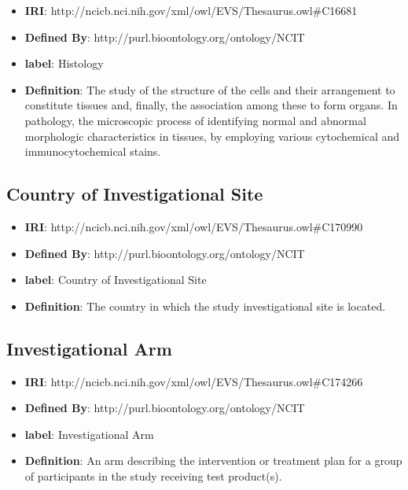 \documentclass[a4paper,12pt,oneside]{article}
\begin{document}
   \begin{itemize}
      \item \textbf{IRI}: http://ncicb.nci.nih.gov/xml/owl/EVS/Thesaurus.owl\#C16681
      \item \textbf{Defined By}: http://purl.bioontology.org/ontology/NCIT
      \item \textbf{label}: Histology
      \item \textbf{Definition}: The study of the structure of the cells and their arrangement to constitute tissues and, finally, the association among these to form organs. In pathology, the microscopic process of identifying normal and abnormal morphologic characteristics in tissues, by employing various cytochemical and immunocytochemical stains.
  \end{itemize}  


  \subsection{Country of Investigational Site}

  \begin{itemize}
     \item \textbf{IRI}: http://ncicb.nci.nih.gov/xml/owl/EVS/Thesaurus.owl\#C170990
     \item \textbf{Defined By}: http://purl.bioontology.org/ontology/NCIT
     \item \textbf{label}: Country of Investigational Site
     \item \textbf{Definition}: The country in which the study investigational site is located.
  \end{itemize}  


  \subsection{Investigational Arm}

  \begin{itemize}
     \item \textbf{IRI}: http://ncicb.nci.nih.gov/xml/owl/EVS/Thesaurus.owl\#C174266
     \item \textbf{Defined By}: http://purl.bioontology.org/ontology/NCIT
     \item \textbf{label}: Investigational Arm
     \item \textbf{Definition}: An arm describing the intervention or treatment plan for a group of participants in the study receiving test product(s).
  \end{itemize}  
\end{document}
